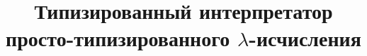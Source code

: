 \documentclass[a4paper,14pt,russian,oneside]{extarticle}
\title{Типизированный интерпретатор просто-типизированного $\lambda$-исчисления}
\begin{document}

\renewcommand{\contentsname}{СОДЕРЖАНИЕ}
\tableofcontents
\newpage





\newpage





\end{document}
